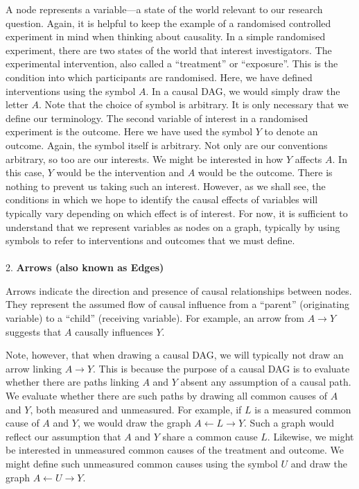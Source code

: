 \documentclass[
  singlecolumn]{article}
\makeatletter
\let\oldparagraph\paragraph
\renewcommand{\paragraph}{
    \@ifstar
      \xxxParagraphStar
      \xxxParagraphNoStar
  }
\newcommand{\xxxParagraphStar}[1]{\oldparagraph*{#1}\mbox{}}
\newcommand{\xxxParagraphNoStar}[1]{\oldparagraph{#1}\mbox{}}
\makeatother
\begin{document}
A node represents a variable---a state of the world relevant to our
research question. Again, it is helpful to keep the example of a
randomised controlled experiment in mind when thinking about causality.
In a simple randomised experiment, there are two states of the world
that interest investigators. The experimental intervention, also called
a ``treatment'' or ``exposure''. This is the condition into which
participants are randomised. Here, we have defined interventions using
the symbol \(A\). In a causal DAG, we would simply draw the letter
\(A\). Note that the choice of symbol is arbitrary. It is only necessary
that we define our terminology. The second variable of interest in a
randomised experiment is the outcome. Here we have used the symbol \(Y\)
to denote an outcome. Again, the symbol itself is arbitrary. Not only
are our conventions arbitrary, so too are our interests. We might be
interested in how \(Y\) affects \(A\). In this case, \(Y\) would be the
intervention and \(A\) would be the outcome. There is nothing to prevent
us taking such an interest. However, as we shall see, the conditions in
which we hope to identify the causal effects of variables will typically
vary depending on which effect is of interest. For now, it is sufficient
to understand that we represent variables as nodes on a graph, typically
by using symbols to refer to interventions and outcomes that we must
define.

\paragraph{\texorpdfstring{2. \textbf{Arrows (also known as
Edges)}}{2. Arrows (also known as Edges)}}\label{arrows-also-known-as-edges}

Arrows indicate the direction and presence of causal relationships
between nodes. They represent the assumed flow of causal influence from
a ``parent'' (originating variable) to a ``child'' (receiving variable).
For example, an arrow from \(A \rightarrow Y\) suggests that \(A\)
causally influences \(Y\).

Note, however, that when drawing a causal DAG, we will typically not
draw an arrow linking \(A \rightarrow Y\). This is because the purpose
of a causal DAG is to evaluate whether there are paths linking \(A\) and
\(Y\) absent any assumption of a causal path. We evaluate whether there
are such paths by drawing all common causes of \(A\) and \(Y\), both
measured and unmeasured. For example, if \(L\) is a measured common
cause of \(A\) and \(Y\), we would draw the graph
\(A \leftarrow L \rightarrow Y\). Such a graph would reflect our
assumption that \(A\) and \(Y\) share a common cause \(L\). Likewise, we
might be interested in unmeasured common causes of the treatment and
outcome. We might define such unmeasured common causes using the symbol
\(U\) and draw the graph \(A \leftarrow U \rightarrow Y\).
\end{document}

